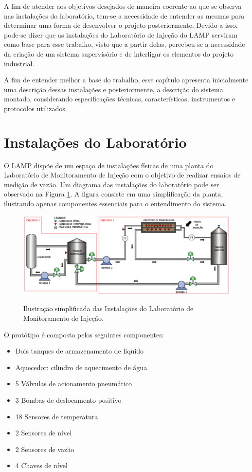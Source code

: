 \label{Cap:estruturaSistema}


A fim de atender aos objetivos desejados de maneira coerente ao que se observa nas instalações do laboratório, tem-se a necessidade de entender as mesmas para determinar uma forma de desenvolver o projeto posteriormente. Devido a isso, pode-se dizer que as instalações do Laboratório de Injeção do LAMP serviram como base para esse trabalho, visto que a partir delas, percebeu-se a necessidade da criação de um sistema supervisório e de interligar os elementos do projeto industrial. 

A fim de entender melhor a base do trabalho, esse capítulo apresenta inicialmente uma descrição dessas instalações e posteriormente, a descrição do sistema montado, considerando especificações técnicas, características, instrumentos e protocolos utilizados.

\section{Instalações do Laboratório}

O LAMP dispõe de um espaço de instalações físicas de uma planta do Laboratório de Monitoramento de Injeção com o objetivo de realizar ensaios de medição de vazão. Um diagrama das instalações do laboratório pode ser observado na Figura \ref{fig:Planta}. A figura consiste em uma simplificação da planta, ilustrando apenas componentes essenciais para o entendimento do sistema.



\begin{figure}[h!]
  \center
  \includegraphics[scale=0.6]{Planta.png}
  \label{fig:Planta}
  \caption{Ilustração simplificada das Instalações do Laboratório de Monitoramento de Injeção.}
\end{figure}


O protótipo é composto pelos seguintes componentes:

\begin{itemize}
    \item Dois tanques de armazenamento de líquido
    \item Aquecedor: cilindro de aquecimento de água
    \item 5 Válvulas de acionamento pneumático
    \item 3 Bombas de deslocamento positivo
    \item 18 Sensores de temperatura
    \item 2 Sensores de nível
    \item 2 Sensores de vazão
    \item 4 Chaves de nível
\end{itemize}


